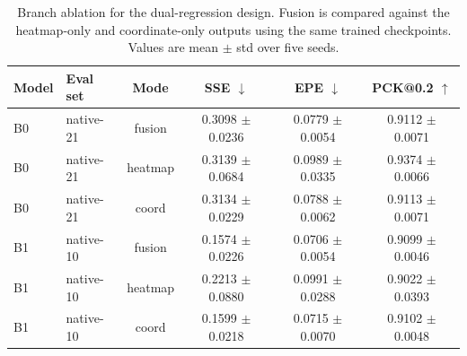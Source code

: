 \documentclass[10pt,letterpaper]{article}
\begin{document}
\begin{table}[H]
\centering
\footnotesize
\caption{Branch ablation for the dual-regression design. Fusion is compared against the heatmap-only and coordinate-only outputs using the same trained checkpoints. Values are mean $\pm$ std over five seeds.}
\label{tab:branch_ablation}
\begin{tabular}{llcccc}
\toprule
Model & Eval set & Mode & SSE $\downarrow$ & EPE $\downarrow$ & PCK@0.2 $\uparrow$ \\
\midrule
B0 & native-21 & fusion & 0.3098 $\pm$ 0.0236 & 0.0779 $\pm$ 0.0054 & 0.9112 $\pm$ 0.0071 \\
B0 & native-21 & heatmap & 0.3139 $\pm$ 0.0684 & 0.0989 $\pm$ 0.0335 & 0.9374 $\pm$ 0.0066 \\
B0 & native-21 & coord & 0.3134 $\pm$ 0.0229 & 0.0788 $\pm$ 0.0062 & 0.9113 $\pm$ 0.0071 \\
B1 & native-10 & fusion & 0.1574 $\pm$ 0.0226 & 0.0706 $\pm$ 0.0054 & 0.9099 $\pm$ 0.0046 \\
B1 & native-10 & heatmap & 0.2213 $\pm$ 0.0880 & 0.0991 $\pm$ 0.0288 & 0.9022 $\pm$ 0.0393 \\
B1 & native-10 & coord & 0.1599 $\pm$ 0.0218 & 0.0715 $\pm$ 0.0070 & 0.9102 $\pm$ 0.0048 \\
\bottomrule
\end{tabular}
\end{table}

\begin{table}[H]
\centering
\footnotesize
\caption{Transfer-learning results for the four training sequences evaluated on both RHD and HK26K. Where C... refers to the COCO annotation of HK26K and is used as a shorthand. Values are mean $\pm$ std over five seeds, and fusion-mode evaluation is shown.}
\label{tab:transfer_learning}
\end{table}
\end{document}
